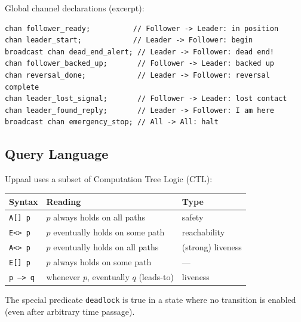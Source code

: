 \documentclass[11pt, a4paper]{article}
\begin{document}
\noindent Global channel declarations (excerpt):

\begin{lstlisting}[style=uppaalcode, caption={Global declarations in leader\_follower.xml.}]
chan follower_ready;          // Follower -> Leader: in position
chan leader_start;            // Leader -> Follower: begin
broadcast chan dead_end_alert; // Leader -> Follower: dead end!
chan follower_backed_up;       // Follower -> Leader: backed up
chan reversal_done;            // Leader -> Follower: reversal complete
chan leader_lost_signal;       // Follower -> Leader: lost contact
chan leader_found_reply;       // Leader -> Follower: I am here
broadcast chan emergency_stop; // All -> All: halt
\end{lstlisting}

\subsection{Query Language}

Uppaal uses a subset of Computation Tree Logic (CTL):

\begin{center}
\begin{tabular}{lll}
\toprule
\textbf{Syntax} & \textbf{Reading} & \textbf{Type} \\
\midrule
\texttt{A[] p}   & $p$ always holds on all paths & safety \\
\texttt{E<> p}   & $p$ eventually holds on some path & reachability \\
\texttt{A<> p}   & $p$ eventually holds on all paths & (strong) liveness \\
\texttt{E[] p}   & $p$ always holds on some path & — \\
\texttt{p --> q} & whenever $p$, eventually $q$ (leads-to) & liveness \\
\bottomrule
\end{tabular}
\end{center}

\noindent The special predicate \texttt{deadlock} is true in a state where no transition
is enabled (even after arbitrary time passage).
\end{document}

